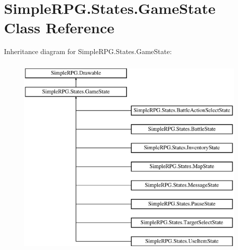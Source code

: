 \hypertarget{class_simple_r_p_g_1_1_states_1_1_game_state}{\section{Simple\+R\+P\+G.\+States.\+Game\+State Class Reference}
\label{class_simple_r_p_g_1_1_states_1_1_game_state}
}
Inheritance diagram for Simple\+R\+P\+G.\+States.\+Game\+State\+:\begin{figure}[H]
\begin{center}
\leavevmode
\includegraphics[height=10.000000cm]{class_simple_r_p_g_1_1_states_1_1_game_state}
\end{center}
\end{figure}
